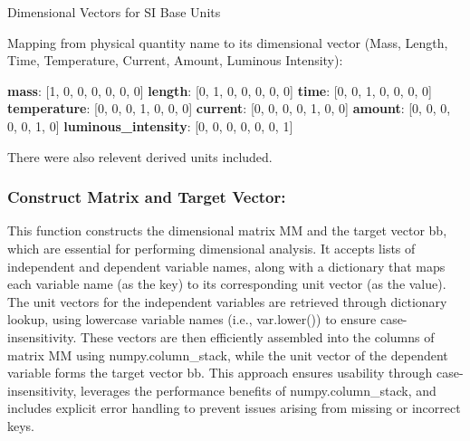 \documentclass{article}
\begin{document}
\begin{algorithm}[H]
\SetAlgoLined
\caption{Dimensional Vectors for SI Base Units}
\label{alg:unit_table} %

Mapping from physical quantity name to its dimensional vector (Mass, Length, Time, Temperature, Current, Amount, Luminous Intensity):\;
\vspace{0.5em} %

\textbf{mass}:                 [1, 0, 0, 0, 0, 0, 0]\;
\textbf{length}:               [0, 1, 0, 0, 0, 0, 0]\;
\textbf{time}:                 [0, 0, 1, 0, 0, 0, 0]\;
\textbf{temperature}:          [0, 0, 0, 1, 0, 0, 0]\;
\textbf{current}:              [0, 0, 0, 0, 1, 0, 0]\;
\textbf{amount}:               [0, 0, 0, 0, 0, 1, 0]\;
\textbf{luminous\_intensity}:   [0, 0, 0, 0, 0, 0, 1]\; %

\end{algorithm}


There were also relevent derived units included.\\ 

\subsubsection{Construct Matrix and Target Vector:}

This function constructs the dimensional matrix MM and the target vector bb, which are essential for performing dimensional analysis. It accepts lists of independent and dependent variable names, along with a dictionary that maps each variable name (as the key) to its corresponding unit vector (as the value). The unit vectors for the independent variables are retrieved through dictionary lookup, using lowercase variable names (i.e., var.lower()) to ensure case-insensitivity. These vectors are then efficiently assembled into the columns of matrix MM using numpy.column_stack, while the unit vector of the dependent variable forms the target vector bb. This approach ensures usability through case-insensitivity, leverages the performance benefits of numpy.column_stack, and includes explicit error handling to prevent issues arising from missing or incorrect keys.\\
\end{document}
